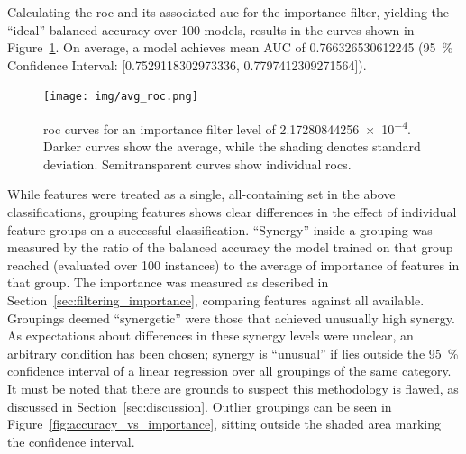 Calculating the \ac{roc} and its associated \ac{auc} for the importance filter, 
yielding the \enquote{ideal} balanced accuracy over \num{100} models, results
in the curves shown in Figure~\ref{fig:avg_roc}. On average, a model achieves 
mean AUC of \num{0.766326530612245} (\SI{95}{\percent} Confidence Interval:
[\num{0.7529118302973336}, \num{0.7797412309271564}]).

\begin{figure}[H]
    \centering
    \texttt{[image: img/avg\_roc.png]}
    \caption{\ac{roc} curves for an importance filter level of \num{2.17280844256e-4}. Darker curves show the average, while the shading denotes standard deviation. Semitransparent curves show individual \acp{roc}.}\label{fig:avg_roc}
\end{figure}


While features were treated as a single, all-containing set in the above 
classifications, grouping features shows clear differences in the effect of 
individual feature groups on a successful classification. \enquote{Synergy}
inside a grouping was measured by the ratio of the balanced accuracy the model
trained on that group reached (evaluated over 100 instances) to the average of
importance of features in that group. The importance was measured as described 
in Section~\ref{sec:filtering_importance}, comparing features against all 
available. Groupings deemed \enquote{synergetic} were those that achieved 
unusually high synergy. As expectations about differences in these synergy 
levels were unclear, an arbitrary condition has been chosen; synergy is 
\enquote{unusual} if lies outside the \SI{95}{\percent} confidence interval of
a linear regression over all groupings of the same category. It must be noted 
that there are grounds to suspect this methodology is flawed, as discussed in 
Section~\ref{sec:discussion}. Outlier groupings can be seen in 
Figure~\ref{fig:accuracy_vs_importance}, sitting outside the shaded area marking
the confidence interval.

